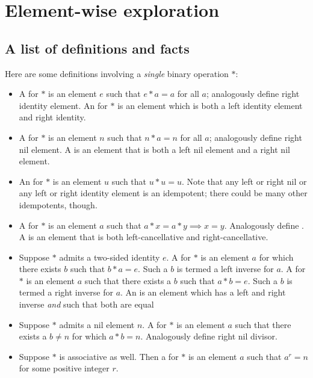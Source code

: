 \documentclass[a4paper]{amsart}
\begin{document}
\section{Element-wise exploration}

\subsection{A list of definitions and facts}

Here are some definitions involving a {\em single} binary operation $*$:

\begin{definer}
  \begin{itemize}

  \item A  for $*$ is an element $e$
    such that $e * a = a$ for all $a$; analogously define right
    identity element. An  for $*$ is an
    element which is both a left identity element and right identity.

  \item A  for $*$ is an element $n$ such
    that $n * a = n$ for all $a$; analogously define right nil
    element. A  is an element that is both a
    left nil element and a right nil element.

  \item An  for $*$ is an element $u$ such that
    $u * u = u$. Note that any left or right nil or any left or right
    identity element is an idempotent; there could be many other
    idempotents, though.

  \item A  for $*$ is an element
    $a$ such that $a * x = a * y \implies x = y$. Analogously define
    . A
     is an element that is both
    left-cancellative and right-cancellative.
  \item Suppose $*$ admits a two-sided identity $e$. A
     for $*$ is an element $a$ for
    which there exists $b$ such that $b * a = e$. Such a $b$ is termed
    a left inverse for $a$. A 
    for $*$ is an element $a$ such that there exists a $b$ such that
    $a * b = e$. Such a $b$ is termed a right inverse for $a$. An
     is an element which has a left and
    right inverse {\em and} such that both are equal

  \item Suppose $*$ admits a nil element $n$. A  for $*$ is an element $a$ such that there exists a $b
    \ne n$ for which $a * b = n$. Analogously define right nil
    divisor.

  \item Suppose $*$ is associative as well. Then a
     for $*$ is an element $a$ such that $a^r =
    n$ for some positive integer $r$.

  \end{itemize}
\end{definer}
\end{document}
